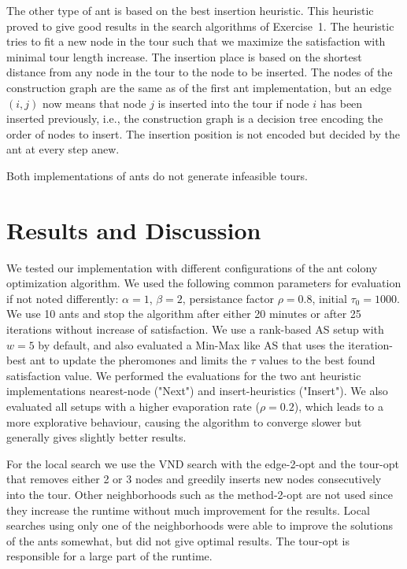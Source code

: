 \documentclass{article}
\begin{document}
The other type of ant is based on the best insertion heuristic. This heuristic proved to give good results in the search algorithms of Exercise~1. 
The heuristic tries to fit a new node in the tour such that we maximize the satisfaction with minimal tour length increase.
The insertion place is based on the shortest distance from any node in the tour to the node to be inserted.
The nodes of the construction graph are the same as of the first ant implementation, but an edge $(i,j)$ now means that node $j$ is inserted
into the tour if node $i$ has been inserted previously, i.e., the construction graph is a decision tree encoding the order of nodes to insert.
The insertion position is not encoded but decided by the ant at every step anew. 

Both implementations of ants do not generate infeasible tours.


\section{Results and Discussion}

We tested our implementation with different configurations of the ant colony optimization algorithm. We used the following common parameters
for evaluation if not noted differently: $\alpha = 1$, $\beta = 2$, persistance factor $\rho = 0.8$, initial $\tau_0 = 1000$. We use 10 ants
and stop the algorithm after either 20 minutes or after 25 iterations without increase of satisfaction. We use a rank-based AS setup with
$w=5$ by default, and also evaluated a Min-Max like AS that uses the iteration-best ant to update the pheromones and limits the $\tau$
values to the best found satisfaction value. We performed the evaluations for the two ant heuristic implementations nearest-node ("Next")
and insert-heuristics ("Insert"). We also evaluated all setups with a higher evaporation rate ($\rho = 0.2$), which leads to a more
explorative behaviour, causing the algorithm to converge slower but generally gives slightly better results.

For the local search we use the VND search with the edge-2-opt and the tour-opt that removes either 2 or 3 nodes and greedily inserts new nodes consecutively
into the tour. Other neighborhoods such as the method-2-opt are not used since they increase the runtime without much improvement for the
results. Local searches using only one of the neighborhoods were able to improve the solutions of the ants somewhat, but did not give
optimal results. The tour-opt is responsible for a large part of the runtime.
\end{document}
